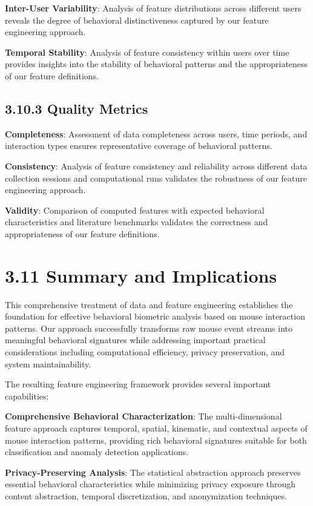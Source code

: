 \documentclass[
  12pt,
  a4paper,
]{report}
\begin{document}
\textbf{Inter-User Variability}: Analysis of feature distributions
across different users reveals the degree of behavioral distinctiveness
captured by our feature engineering approach.

\textbf{Temporal Stability}: Analysis of feature consistency within
users over time provides insights into the stability of behavioral
patterns and the appropriateness of our feature definitions.

\subsection{3.10.3 Quality Metrics}\label{quality-metrics}

\textbf{Completeness}: Assessment of data completeness across users,
time periods, and interaction types ensures representative coverage of
behavioral patterns.

\textbf{Consistency}: Analysis of feature consistency and reliability
across different data collection sessions and computational runs
validates the robustness of our feature engineering approach.

\textbf{Validity}: Comparison of computed features with expected
behavioral characteristics and literature benchmarks validates the
correctness and appropriateness of our feature definitions.

\section{3.11 Summary and Implications}\label{summary-and-implications}

This comprehensive treatment of data and feature engineering establishes
the foundation for effective behavioral biometric analysis based on
mouse interaction patterns. Our approach successfully transforms raw
mouse event streams into meaningful behavioral signatures while
addressing important practical considerations including computational
efficiency, privacy preservation, and system maintainability.

The resulting feature engineering framework provides several important
capabilities:

\textbf{Comprehensive Behavioral Characterization}: The
multi-dimensional feature approach captures temporal, spatial,
kinematic, and contextual aspects of mouse interaction patterns,
providing rich behavioral signatures suitable for both classification
and anomaly detection applications.

\textbf{Privacy-Preserving Analysis}: The statistical abstraction
approach preserves essential behavioral characteristics while minimizing
privacy exposure through content abstraction, temporal discretization,
and anonymization techniques.
\end{document}
